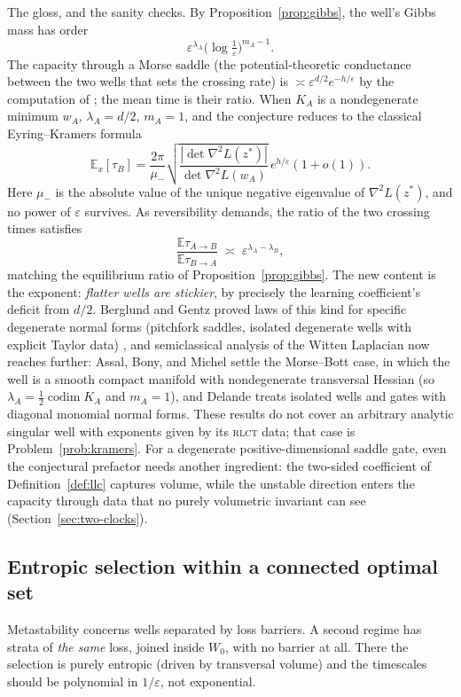 \documentclass[11pt]{amsart}
\theoremstyle{plain}
\theoremstyle{definition}
\newcommand{\E}{\mathbb{E}}
\begin{document}
The gloss, and the sanity checks. By Proposition~\ref{prop:gibbs}, the well's Gibbs mass has order
\[
\varepsilon^{\lambda_A}\bigl(\log\tfrac1\varepsilon\bigr)^{m_A-1}.
\]
The capacity through a Morse saddle (the potential-theoretic conductance between the two wells that sets the crossing rate) is $\asymp \varepsilon^{d/2} e^{-h/\varepsilon}$ by the computation of \cite{begk2004}; the mean time is their ratio. When $K_A$ is a nondegenerate minimum $w_A$, $\lambda_A = d/2$, $m_A = 1$, and the conjecture reduces to the classical Eyring--Kramers formula
\[
\E_x[\tau_B]
=\frac{2\pi}{\mu_-}
\sqrt{\frac{|\det \nabla^2 L(z^*)|}{\det \nabla^2 L(w_A)}}
\,e^{h/\varepsilon}(1+o(1)).
\]
Here $\mu_-$ is the absolute value of the unique negative eigenvalue of $\nabla^2 L(z^*)$, and no power of $\varepsilon$ survives. As reversibility demands, the ratio of the two crossing times satisfies
\[
\frac{\E\tau_{A\to B}}{\E\tau_{B\to A}}
\;\asymp\;
\varepsilon^{\lambda_A-\lambda_B},
\]
matching the equilibrium ratio of Proposition~\ref{prop:gibbs}. The new content is the exponent: \emph{flatter wells are stickier}, by precisely the learning coefficient's deficit from $d/2$. Berglund and Gentz proved laws of this kind for specific degenerate normal forms (pitchfork saddles, isolated degenerate wells with explicit Taylor data) \cite{berglundgentz2010, berglund2013}, and semiclassical analysis of the Witten Laplacian now reaches further: Assal, Bony, and Michel \cite{assal2025} settle the Morse--Bott case, in which the well is a smooth compact manifold with nondegenerate transversal Hessian (so $\lambda_A = \tfrac12 \operatorname{codim} K_A$ and $m_A = 1$), and Delande \cite{delande2024} treats isolated wells and gates with diagonal monomial normal forms. These results do not cover an arbitrary analytic singular well with exponents given by its \textsc{rlct} data; that case is Problem~\ref{prob:kramers}. For a degenerate positive-dimensional saddle gate, even the conjectural prefactor needs another ingredient: the two-sided coefficient of Definition~\ref{def:llc} captures volume, while the unstable direction enters the capacity through data that no purely volumetric invariant can see (Section~\ref{sec:two-clocks}).

\subsection{Entropic selection within a connected optimal set}\label{sec:entropic}

Metastability concerns wells separated by loss barriers. A second regime has strata of \emph{the same} loss, joined inside $W_0$, with no barrier at all. There the selection is purely entropic (driven by transversal volume) and the timescales should be polynomial in $1/\varepsilon$, not exponential.
\end{document}
